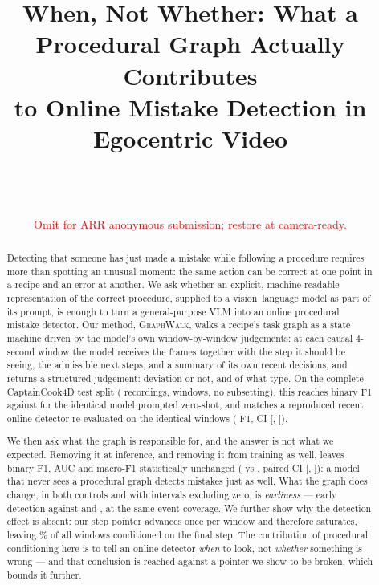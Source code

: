 \documentclass[10pt,twocolumn]{article}
\title{\bf When, Not Whether: What a Procedural Graph Actually Contributes\\
to Online Mistake Detection in Egocentric Video}
\author{
\ph{AUTHOR LIST}\\
\ph{AFFILIATIONS}\\
\texttt{\ph{CONTACT EMAIL}}\\[2pt]
{\small\textcolor{red}{Omit for ARR anonymous submission; restore at camera-ready.}}
}
\date{}
\newcommand{\ourmodel}{\textsc{GraphWalk}}
\begin{document}
\maketitle

\begin{abstract}
Detecting that someone has just made a mistake while following a procedure
requires more than spotting an unusual moment: the same action can be correct
at one point in a recipe and an error at another. We ask whether an explicit,
machine-readable representation of the correct procedure, supplied to a
vision--language model as part of its prompt, is enough to turn a
general-purpose VLM into an online procedural mistake detector. Our method,
\ourmodel{}, walks a recipe's task graph as a state machine driven by the
model's own window-by-window judgements: at each causal 4-second window the
model receives the frames together with the step it should be seeing, the
admissible next steps, and a summary of its own recent decisions, and returns a
structured judgement: deviation or not, and of what type. On the complete
CaptainCook4D test split (\resClips{} recordings, \resWindows{} windows, no
subsetting), this reaches \resF{} binary F1 against \resZS{} for the identical
model prompted zero-shot, and matches a reproduced recent online detector
re-evaluated on the identical windows (\baseDelta{} F1, CI [\baseDeltaLo{},
\baseDeltaHi{}]).

We then ask what the graph is responsible for, and the answer is not what we
expected. Removing it at inference, and removing it from training as well,
leaves binary F1, AUC and macro-F1 statistically unchanged
(\ntF{} vs \resF{}, paired CI [\ntDeltaLo{}, \ntDeltaHi{}]): a model that never
sees a procedural graph detects mistakes just as well. What the graph does
change, in both controls and with intervals excluding zero, is \emph{earliness}
--- early detection \resEDS{} against \ngEDS{} and \ntEDS{}, at the same event
coverage. We further show why the detection effect is absent: our step pointer
advances once per window and therefore saturates, leaving \satPct{}\% of all
windows conditioned on the final step. The contribution of procedural
conditioning here is to tell an online detector \emph{when} to look, not
\emph{whether} something is wrong --- and that conclusion is reached against a
pointer we show to be broken, which bounds it further.
\end{abstract}

\end{document}
